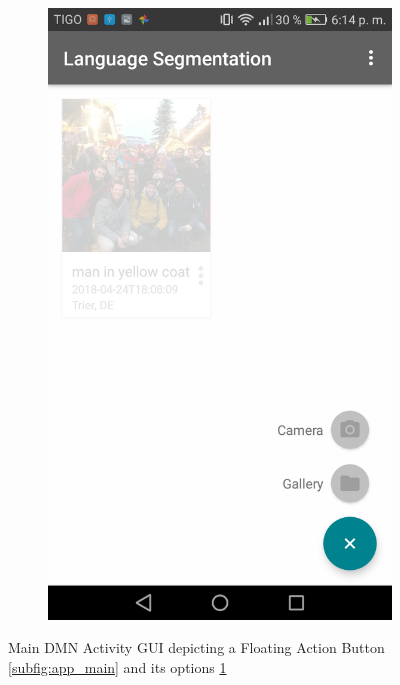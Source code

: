 \begin{figure}[!htbp]
\begin{multicols}{2}
    \begin{subfigure}[b]{\columnwidth}
            \centering
            \includegraphics[width=\textwidth]{./figures/dmn_app/views/2.png}
    \label{subfig:app_img_src}
    \end{subfigure}
    \end{multicols}
    
    \caption{Main DMN Activity GUI depicting a Floating Action Button \ref{subfig:app_main} and its options \ref{subfig:app_img_src}}
    \label{Fig:App_Main}
\end{figure}

